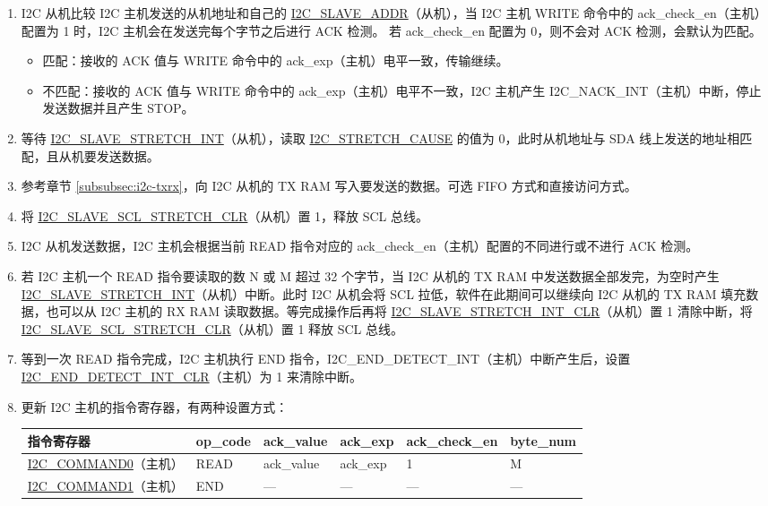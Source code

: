 \documentclass[main\_\_CN.tex]{subfiles}
\begin{document}
\begin{enumerate}
\item I2C 从机比较 I2C 主机发送的从机地址和自己的 \hyperref[fielddesc:I2CSLAVEADDR]{I2C\_SLAVE\_ADDR}（从机），当 I2C 主机 WRITE 命令中的 ack\_check\_en（主机）配置为 1 时，I2C 主机会在发送完每个字节之后进行 ACK 检测。 若 ack\_check\_en 配置为 0，则不会对 ACK 检测，会默认为匹配。
\begin{itemize}
\item 匹配：接收的 ACK 值与 WRITE 命令中的 ack\_exp（主机）电平一致，传输继续。
\item 不匹配：接收的 ACK 值与 WRITE 命令中的 ack\_exp（主机）电平不一致，I2C 主机产生 I2C\_NACK\_INT（主机）中断，停止发送数据并且产生 STOP。
\end{itemize}

\item 等待 \hyperref[int:i2c-slave-stretch]{I2C\_SLAVE\_STRETCH\_INT}（从机），读取 \hyperref[fielddesc:I2CSTRETCHCAUSE]{I2C\_STRETCH\_CAUSE} 的值为 0，此时从机地址与 SDA 线上发送的地址相匹配，且从机要发送数据。

\item 参考章节 \ref{subsubsec:i2c-txrx}，向 I2C 从机的 TX RAM 写入要发送的数据。可选 FIFO 方式和直接访问方式。
\item 将 \hyperref[fielddesc:I2CSLAVESCLSTRETCHCLR]{I2C\_SLAVE\_SCL\_STRETCH\_CLR}（从机）置 1，释放 SCL 总线。

\item I2C 从机发送数据，I2C 主机会根据当前 READ 指令对应的 ack\_check\_en（主机）配置的不同进行或不进行 ACK 检测。
\item 若 I2C 主机一个 READ 指令要读取的数 N 或 M 超过 32 个字节，当 I2C 从机的 TX RAM 中发送数据全部发完，为空时产生 \hyperref[int:i2c-slave-stretch]{I2C\_SLAVE\_STRETCH\_INT}（从机）中断。此时 I2C 从机会将 SCL 拉低，软件在此期间可以继续向 I2C 从机的 TX RAM 填充数据，也可以从 I2C 主机的 RX RAM 读取数据。等完成操作后再将 \hyperref[fielddesc:I2CSLAVESTRETCHINTCLR]{I2C\_SLAVE\_STRETCH\_INT\_CLR}（从机）置 1 清除中断，将 \hyperref[fielddesc:I2CSLAVESCLSTRETCHCLR]{I2C\_SLAVE\_SCL\_STRETCH\_CLR}（从机）置 1 释放 SCL 总线。

\item 等到一次 READ 指令完成，I2C 主机执行 END 指令，I2C\_END\_DETECT\_INT（主机）中断产生后，设置 \hyperref[fielddesc:I2CENDDETECTINTCLR]{I2C\_END\_DETECT\_INT\_CLR}（主机）为 1 来清除中断。

\clearpage
\item 更新 I2C 主机的指令寄存器，有两种设置方式：

\begin{longtable}{ | p{4cm} | p{2cm} | p{2cm} | p{2cm} |p{2cm} | p{2cm} |}
\hline\rowcolor{lightgray}
指令寄存器& op\_code & ack\_value&ack\_exp&ack\_check\_en&byte\_num  \\ \hline
\hyperref[fielddesc:I2CCOMMAND0]{I2C\_COMMAND0}（主机）& READ& ack\_value&ack\_exp&1&M  \\ \hline
\hyperref[fielddesc:I2CCOMMAND1]{I2C\_COMMAND1}（主机）& END& ---&---&---&---  \\ \hline
\end{longtable}


\end{enumerate}
\end{document}
